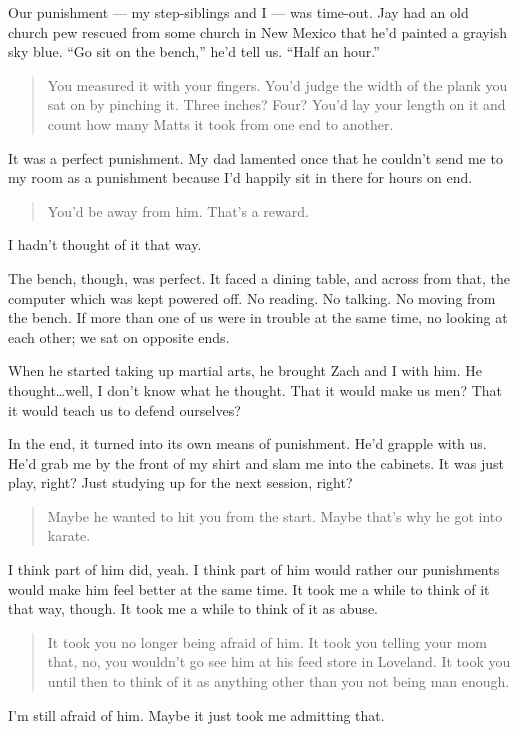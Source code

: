 Our punishment --- my step-siblings and I --- was time-out. Jay had an old church pew rescued from some church in New Mexico that he'd painted a grayish sky blue. ``Go sit on the bench,'' he'd tell us. ``Half an hour.''

\begin{quote}
You measured it with your fingers. You'd judge the width of the plank you sat on by pinching it. Three inches? Four? You'd lay your length on it and count how many Matts it took from one end to another.
\end{quote}

It was a perfect punishment. My dad lamented once that he couldn't send me to my room as a punishment because I'd happily sit in there for hours on end.

\begin{quote}
You'd be away from him. That's a reward.
\end{quote}

I hadn't thought of it that way.

The bench, though, was perfect. It faced a dining table, and across from that, the computer which was kept powered off. No reading. No talking. No moving from the bench. If more than one of us were in trouble at the same time, no looking at each other; we sat on opposite ends.

When he started taking up martial arts, he brought Zach and I with him. He thought\ldots{}well, I don't know what he thought. That it would make us men? That it would teach us to defend ourselves?

In the end, it turned into its own means of punishment. He'd grapple with us. He'd grab me by the front of my shirt and slam me into the cabinets. It was just play, right? Just studying up for the next session, right?

\begin{quote}
Maybe he wanted to hit you from the start. Maybe that's why he got into karate.
\end{quote}

I think part of him did, yeah. I think part of him would rather our punishments would make him feel better at the same time. It took me a while to think of it that way, though. It took me a while to think of it as abuse.

\begin{quote}
It took you no longer being afraid of him. It took you telling your mom that, no, you wouldn't go see him at his feed store in Loveland. It took you until then to think of it as anything other than you not being man enough.
\end{quote}

I'm still afraid of him. Maybe it just took me admitting that.
